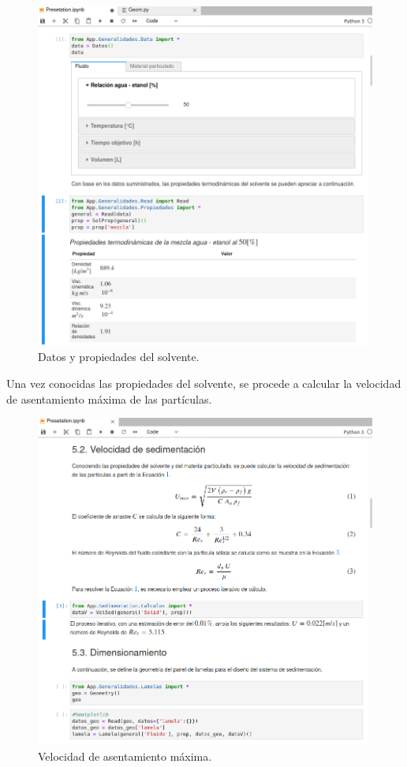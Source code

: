 \begin{figure}[h!]
	\centering
	\includegraphics[width=\textwidth]{Images/Anexos/3.png}
	\caption{Datos y propiedades del solvente.}
	\label{propSoft}
\end{figure}

\newpage

\noindent
\justify

Una vez conocidas las propiedades del solvente, se procede a calcular la velocidad de asentamiento m\'axima de las part\'iculas.

\begin{figure}[h!]
	\centering
	\includegraphics[width=\textwidth]{Images/Anexos/4.png}
	\caption{Velocidad de asentamiento m\'axima.}
	\label{velasSoft}
\end{figure}

